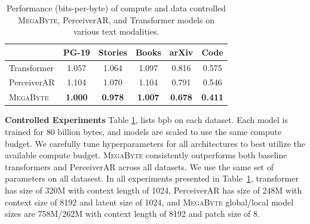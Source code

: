 \documentclass{article}
\newcommand{\fastslow}[0]{\textsc{MegaByte}\xspace}
\newcommand{\megabyte}[0]{\fastslow}
\theoremstyle{plain}
\theoremstyle{definition}
\theoremstyle{remark}
\begin{document}
\begin{table}[t]
\centering\small
\begin{tabular}{l|ccccc}
\toprule
& PG-19 & Stories & Books & arXiv & Code \\
\midrule
Transformer & 1.057 & 1.064 & 1.097 & 0.816 & 0.575 \\
PerceiverAR & 1.104 & 1.070 & 1.104 & 0.791 & 0.546 \\
\megabyte & \textbf{1.000} & \textbf{0.978} & \textbf{1.007} & \textbf{0.678} & \textbf{0.411} \\
\bottomrule
\end{tabular}
\caption{Performance (bits-per-byte) of compute and data controlled \megabyte, PerceiverAR, and Transformer models on various text modalities. }
\label{tab:text_exps}
\end{table}

\textbf{Controlled Experiments} Table \ref{tab:text_exps}, lists bpb on each dataset. Each model is trained for 80 billion bytes, and models are scaled to use the same compute budget. We carefully tune hyperparameters for all architectures to best utilize the available compute budget. \megabyte consistently outperforms both baseline transformers and PerceiverAR across all datasets. We use the same set of parameters on all datasest. In all experiments presented in Table~\ref{tab:text_exps}, transformer has size of 320M with context length of 1024, PerceiverAR has size of 248M with context size of 8192 and latent size of 1024, and \megabyte global/local model sizes are 758M/262M with context length of 8192 and patch size of 8. 
\end{document}
